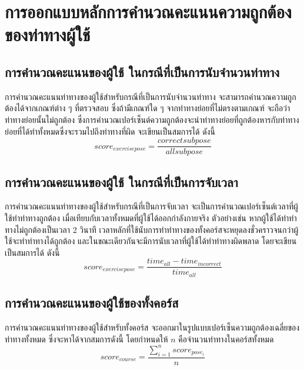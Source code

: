 \section{การออกแบบหลักการคำนวณคะแนนความถูกต้องของท่าทางผู้ใช้}
\subsection{การคำนวณคะแนนของผู้ใช้ ในกรณีที่เป็นการนับจำนวนท่าทาง}
การคำนวณคะแนนท่าทางของผู้ใช้สำหรับกรณีที่เป็นการนับจำนวนท่าทาง จะสามารถคำนวณความถูกต้องได้จากเกณฑ์ต่าง ๆ ที่ตรวจสอบ ซึ่งถ้ามีเกณฑ์ใด ๆ จากท่าทางย่อยที่ไม่ตรงตามเกณฑ์ จะถือว่าท่าทางย่อยนั้นไม่ถูกต้อง ซึ่งการคำนวณเปอร์เซ็นต์ความถูกต้องจะนำท่าทางย่อยที่ถูกต้องหารกับท่าทางย่อยที่ได้ทำทั้งหมดซึ่งจะรวมไปถึงท่าทางที่ผิด จะเขียนเป็นสมการได้ ดังนี้
\begin{equation}
    score_{exercise pose} = \frac{correct subpose}{all subpose}
\end{equation}

\subsection{การคำนวณคะแนนของผู้ใช้ ในกรณีที่เป็นการจับเวลา}
การคำนวณคะแนนท่าทางของผู้ใช้สำหรับกรณีที่เป็นการจับเวลา จะเป็นการคำนวณเปอร์เซ็นต์เวลาที่ผู้ใช้ทำท่าทางถูกต้อง เมื่อเทียบกับเวลาทั้งหมดที่ผู้ใช้ได้ออกกำลังกายจริง ตัวอย่างเช่น หากผู้ใช้ได้ทำท่าทางไม่ถูกต้องเป็นเวลา 2 วินาที เวลาหลักที่ใช้นับการทำท่าทางของทั้งคอร์สจะหยุดลงชั่วคราวจนกว่าผู้ใช้จะทำท่าทางได้ถูกต้อง และในขณะเดียวกันจะมีการนับเวลาที่ผู้ใช้ได้ทำท่าทางผิดพลาด โดยจะเขียนเป็นสมการได้ ดังนี้
\begin{equation}
     score_{exercise pose} = \frac{time_{all} - time_{incorrect}}{time_{all}}
\end{equation}


\subsection{การคำนวณคะแนนของผู้ใช้ของทั้งคอร์ส}
การคำนวณคะแนนท่าทางของผู้ใช้สำหรับทั้งคอร์ส จะออกมาในรูปแบบเปอร์เซ็นความถูกต้องเฉลี่ยของท่าทางทั้งหมด ซึ่งจะหาได้จากสมการดังนี้ โดยกำหนดให้ $n$ คือจำนวนท่าทางในคอร์สทั้งหมด
\begin{equation}
    score_{course} = \frac{\sum_{i=1}^{n}{score_{pose_i}}}{n}
\end{equation}

